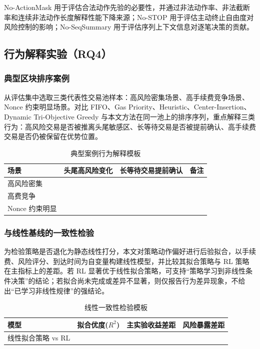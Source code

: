 No-ActionMask 用于评估合法动作先验的必要性，并通过非法动作率、非法截断率和连续非法动作长度解释性能下降来源；No-STOP 用于评估主动终止自由度对风险控制的影响；No-SeqSummary 用于评估序列上下文信息对逐笔决策的贡献。

\subsection{行为解释实验（RQ4）}

\subsubsection{典型区块排序案例}

从评估集中选取三类代表性交易池样本：高风险密集场景、高手续费竞争场景、Nonce 约束明显场景。对比 FIFO、Gas Priority、Heuristic、Center-Insertion、Dynamic Tri-Objective Greedy 与本文方法在同一池上的排序序列，重点解释三类行为：高风险交易是否被推离头尾敏感区、长等待交易是否被提前确认、高手续费交易是否仍被保留在优势位置。

\begin{table}[htbp]
\centering
\caption{典型案例行为解释模板}
\label{tab:case_study}
\begin{tabular}{lccc}
\toprule
场景 & 头尾高风险变化 & 长等待交易提前确认 & 备注 \\
\midrule
高风险密集 & \TODO{} & \TODO{} & \TODO{} \\
高费竞争 & \TODO{} & \TODO{} & \TODO{} \\
Nonce 约束明显 & \TODO{} & \TODO{} & \TODO{} \\
\bottomrule
\end{tabular}
\end{table}

\subsubsection{与线性基线的一致性检验}

为检验策略是否退化为静态线性打分，本文对策略动作偏好进行后验拟合，以手续费、风险评分、到达时间为自变量构建线性模型，并比较其拟合策略与 RL 策略在主指标上的差距。若 RL 显著优于线性拟合策略，可支持“策略学习到非线性条件决策”的结论；若拟合尚未完成或差异不显著，则仅报告行为差异现象，不给出“已学习非线性规律”的强结论。

\begin{table}[htbp]
\centering
\caption{线性一致性检验模板}
\label{tab:linear_check}
\begin{tabular}{lccc}
\toprule
模型 & 拟合优度($R^2$) & 主实验收益差距 & 风险暴露差距 \\
\midrule
线性拟合策略 vs RL & \TODO{} & \TODO{} & \TODO{} \\
\bottomrule
\end{tabular}
\end{table}


